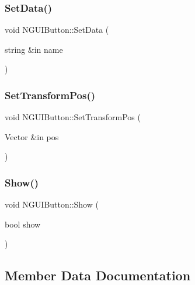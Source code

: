 \hypertarget{class_n_g_u_i_button_aa0362a3ecfd9919190462f57e4b67f41}{}\label{class_n_g_u_i_button_aa0362a3ecfd9919190462f57e4b67f41} 
\subsubsection{\texorpdfstring{Set\+Data()}{SetData()}}
{\footnotesize\ttfamily void N\+G\+U\+I\+Button\+::\+Set\+Data (\begin{DoxyParamCaption}\item[{string \&in}]{name }\end{DoxyParamCaption})}

\hypertarget{class_n_g_u_i_button_ad44bbaa90a9c14b42a0ce3442af1389a}{}\label{class_n_g_u_i_button_ad44bbaa90a9c14b42a0ce3442af1389a} 
\subsubsection{\texorpdfstring{Set\+Transform\+Pos()}{SetTransformPos()}}
{\footnotesize\ttfamily void N\+G\+U\+I\+Button\+::\+Set\+Transform\+Pos (\begin{DoxyParamCaption}\item[{Vector \&in}]{pos }\end{DoxyParamCaption})}

\hypertarget{class_n_g_u_i_button_a448482fd025b3591a7e205dd4b65a8c3}{}\label{class_n_g_u_i_button_a448482fd025b3591a7e205dd4b65a8c3} 
\subsubsection{\texorpdfstring{Show()}{Show()}}
{\footnotesize\ttfamily void N\+G\+U\+I\+Button\+::\+Show (\begin{DoxyParamCaption}\item[{bool}]{show }\end{DoxyParamCaption})}



\subsection{Member Data Documentation}
\hypertarget{class_n_g_u_i_button_afc96adad841cd1c34101fdce32dbf2e4}{}\label{class_n_g_u_i_button_afc96adad841cd1c34101fdce32dbf2e4} 
